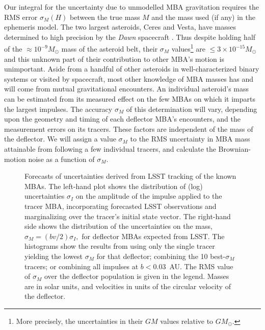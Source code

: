 \documentclass[linenumbers, onecolumn]{aastex631}
\begin{document}
Our integral for the uncertainty due to unmodelled MBA gravitation
requires the RMS error $\sigma_M(H)$ between the true mass $M$ and the
mass used (if any) in the ephemeris model.
The two largest asteroids, Ceres and Vesta, have masses determined to
high precision by the \textit{Dawn} spacecraft \citep{Ceres,Vesta}.  Thus despite holding
half of the $\approx 10^{-9} M_\odot$ mass of the asteroid belt, their $\sigma_M$
values\footnote{More precisely, the uncertainties in their $GM$ values
  relative to $GM_\odot$.} are 
$\le3\times10^{-15} M_\odot$ and
this unknown part of their contribution to other MBA's motion is 
unimportant.  Aside from a handful of other asteroids in
well-characterized binary systems or visited by spacecraft, most other knowledge of MBA masses
has and will come from mutual gravitational encounters.   An
individual asteroid's mass can be estimated from its measured effect  on the
few MBAs on which it imparts the largest impulses.  The accuracy
$\sigma_M$ of this determination will vary, depending upon the
geometry  and timing of
each deflector MBA's encounters, and the measurement errors on its tracers.  These
factors are independent of the mass of the deflector.  We will
assign a value $\sigma_M$ to the RMS uncertainty in MBA mass
attainable from following a few individual tracers, and calculate
the Brownian-motion noise as a function of $\sigma_M.$


\begin{figure}
  \caption{Forecasts of uncertainties derived from LSST tracking of the known MBAs.  The left-hand plot shows the distribution of (log) uncertainties $\sigma_I$ on the amplitude of the impulse applied to the tracer MBA, incorporating forecasted LSST observations and marginalizing over the tracer's initial state vector.  The right-hand side shows the distribution of the uncertainties on the mass, $\sigma_M=(bv/2)\sigma_I,$ for deflector MBAs expected from LSST.  The histograms show the results from using only the single tracer yielding the lowest $\sigma_M$ for that deflector; combining the 10 best-$\sigma_M$ tracers; or combining all impulses at $b<0.03$~AU.  The RMS value of $\sigma_M$ over the deflector population is given in the legend.  Masses are in solar units, and velocities in units of the circular velocity of the deflector.}
  \label{fig:sigmaI}
\end{figure}
\end{document}
